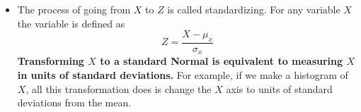 \begin{itemize}
\begin{equation*}
{\rm var}(Y) = {\rm var}(aX) + {\rm var}(b)
\end{equation*}
Form the formula for variance, we know ${\rm var}(aX)  = a^2{\rm var}(X)$. Also, ${\rm var}(b) =0$
So 
\begin{equation*}\label{eq:normal_linear_trans}
Y \sim {\rm Normal}(a\mu_x + b,a^2\sigma_x^2).
\end{equation*}
Note that in going from $Z$ to $X$ and $X$ to $Y$, we are just multiplying and shifting everything.
Think about what this does to the histogram. 
\item The process of going from $X$ to $Z$ is called standardizing. For any variable $X$ the  variable is defined as 
\begin{equation*}
Z = \frac{X-\mu_x}{\sigma_x}
\end{equation*}
 {\bf Transforming $X$ to a standard Normal is equivalent to measuring $X$ in units of standard deviations.} For example, if we make a histogram of $X$, all this transformation does is change the $X$ axis to units of standard deviations from the mean. 
 



\end{itemize}
